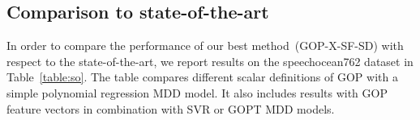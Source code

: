 
\begin{table}
\centering
\caption{speechocean762, reported with Pearson correlation coefficients}
\label{table:so}
% 

\end{table}

\subsection{Comparison to state-of-the-art}
In order to compare the performance of our best method~(GOP-X-SF-SD) with respect to the state-of-the-art, we report results on the speechocean762 dataset in Table~\ref{table:so}.
The table compares different scalar definitions of GOP with a simple polynomial regression MDD model.
It also includes results with GOP feature vectors in combination with SVR or GOPT MDD models.

